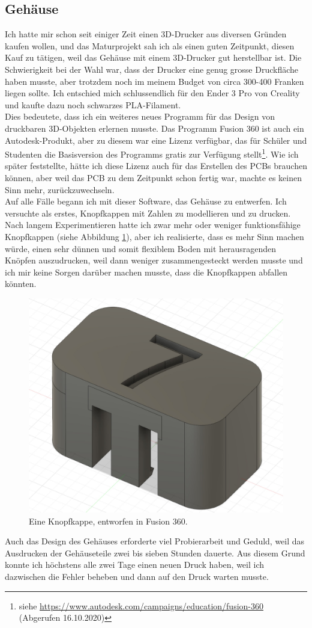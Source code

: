 \documentclass[12pt, a4paper]{report}
\begin{document}
\subsection{Gehäuse}
Ich hatte mir schon seit einiger Zeit einen 3D-Drucker aus diversen Gründen kaufen wollen, und das Maturprojekt sah ich als einen guten Zeitpunkt, diesen Kauf zu tätigen, weil das Gehäuse mit einem 3D-Drucker gut herstellbar ist. Die Schwierigkeit bei der Wahl war, dass der Drucker eine genug grosse Druckfläche haben musste, aber trotzdem noch im meinem Budget von circa 300-400 Franken liegen sollte. Ich entschied mich schlussendlich für den Ender 3 Pro von Creality und kaufte dazu noch schwarzes PLA-Filament.
\\[\medskipamount]
Dies bedeutete, dass ich ein weiteres neues Programm für das Design von druckbaren 3D-Objekten erlernen musste. Das Programm Fusion 360 ist auch ein Autodesk-Produkt, aber zu diesem war eine Lizenz verfügbar, das für Schüler und Studenten die Basisversion des Programms gratis zur Verfügung stellt\footnote{siehe \url{https://www.autodesk.com/campaigns/education/fusion-360} (Abgerufen 16.10.2020)}. Wie ich später feststellte, hätte ich diese Lizenz auch für das Erstellen des PCBs brauchen können, aber weil das PCB zu dem Zeitpunkt schon fertig war, machte es keinen Sinn mehr, zurückzuwechseln.
\\[\medskipamount]
Auf alle Fälle begann ich mit dieser Software, das Gehäuse zu entwerfen. Ich versuchte als erstes, Knopfkappen mit Zahlen zu modellieren und zu drucken. Nach langem Experimentieren hatte ich zwar mehr oder weniger funktionsfähige Knopfkappen (siehe Abbildung \ref{fig:buttoncap}), aber ich realisierte, dass es mehr Sinn machen würde, einen sehr dünnen und somit flexiblem Boden mit herausragenden Knöpfen auszudrucken, weil dann weniger zusammengesteckt werden musste und ich mir keine Sorgen darüber machen musste, dass die Knopfkappen abfallen könnten.
\begin{figure}[H]
	\centering
	\includegraphics[width=0.3\linewidth]{assets/button7.jpg}
	\caption{Eine Knopfkappe, entworfen in Fusion 360.}
	\label{fig:buttoncap}
\end{figure}
\noindent
Auch das Design des Gehäuses erforderte viel Probierarbeit und Geduld, weil das Ausdrucken der Gehäuseteile zwei bis sieben Stunden dauerte. Aus diesem Grund konnte ich höchstens alle zwei Tage einen neuen Druck haben, weil ich dazwischen die Fehler beheben und dann auf den Druck warten musste.
\end{document}
